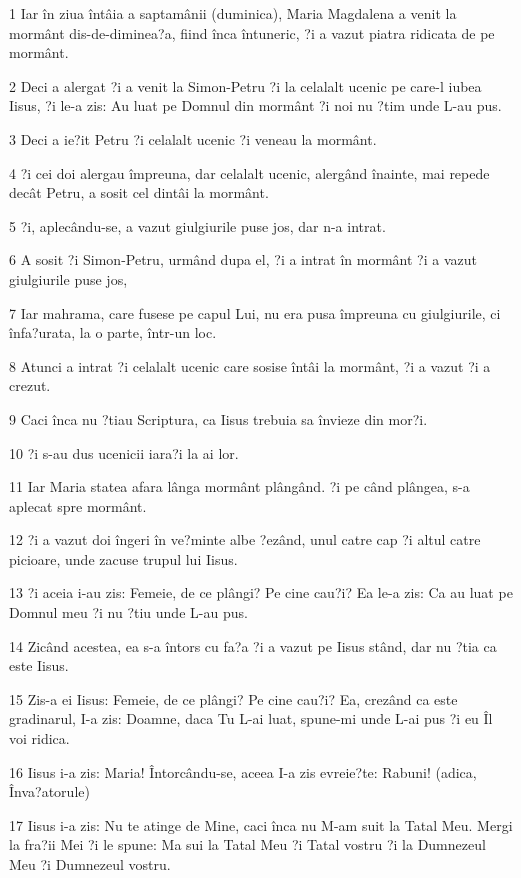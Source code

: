 \par 1 Iar în ziua întâia a saptamânii (duminica), Maria Magdalena a venit la mormânt dis-de-diminea?a, fiind înca întuneric, ?i a vazut piatra ridicata de pe mormânt.
\par 2 Deci a alergat ?i a venit la Simon-Petru ?i la celalalt ucenic pe care-l iubea Iisus, ?i le-a zis: Au luat pe Domnul din mormânt ?i noi nu ?tim unde L-au pus.
\par 3 Deci a ie?it Petru ?i celalalt ucenic ?i veneau la mormânt.
\par 4 ?i cei doi alergau împreuna, dar celalalt ucenic, alergând înainte, mai repede decât Petru, a sosit cel dintâi la mormânt.
\par 5 ?i, aplecându-se, a vazut giulgiurile puse jos, dar n-a intrat.
\par 6 A sosit ?i Simon-Petru, urmând dupa el, ?i a intrat în mormânt ?i a vazut giulgiurile puse jos,
\par 7 Iar mahrama, care fusese pe capul Lui, nu era pusa împreuna cu giulgiurile, ci înfa?urata, la o parte, într-un loc.
\par 8 Atunci a intrat ?i celalalt ucenic care sosise întâi la mormânt, ?i a vazut ?i a crezut.
\par 9 Caci înca nu ?tiau Scriptura, ca Iisus trebuia sa învieze din mor?i.
\par 10 ?i s-au dus ucenicii iara?i la ai lor.
\par 11 Iar Maria statea afara lânga mormânt plângând. ?i pe când plângea, s-a aplecat spre mormânt.
\par 12 ?i a vazut doi îngeri în ve?minte albe ?ezând, unul catre cap ?i altul catre picioare, unde zacuse trupul lui Iisus.
\par 13 ?i aceia i-au zis: Femeie, de ce plângi? Pe cine cau?i? Ea le-a zis: Ca au luat pe Domnul meu ?i nu ?tiu unde L-au pus.
\par 14 Zicând acestea, ea s-a întors cu fa?a ?i a vazut pe Iisus stând, dar nu ?tia ca este Iisus.
\par 15 Zis-a ei Iisus: Femeie, de ce plângi? Pe cine cau?i? Ea, crezând ca este gradinarul, I-a zis: Doamne, daca Tu L-ai luat, spune-mi unde L-ai pus ?i eu Îl voi ridica.
\par 16 Iisus i-a zis: Maria! Întorcându-se, aceea I-a zis evreie?te: Rabuni! (adica, Înva?atorule)
\par 17 Iisus i-a zis: Nu te atinge de Mine, caci înca nu M-am suit la Tatal Meu. Mergi la fra?ii Mei ?i le spune: Ma sui la Tatal Meu ?i Tatal vostru ?i la Dumnezeul Meu ?i Dumnezeul vostru.
